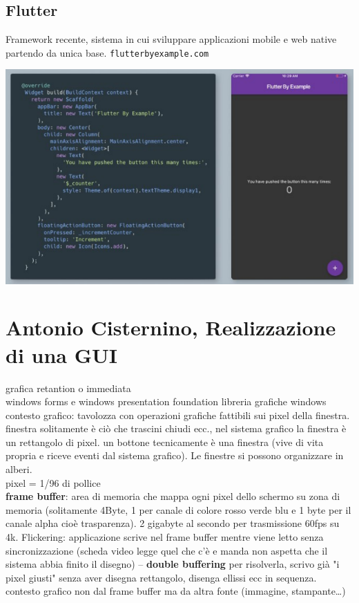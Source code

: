 \documentclass[10pt]{article}
\begin{document}
\subsection{Flutter}
Framework recente, sistema in cui sviluppare applicazioni mobile e web native partendo da unica base. \texttt{flutterbyexample.com}
\begin{center}
\includegraphics[scale=1]{flutter.png}
\end{center}

\pagebreak
\section{Antonio Cisternino, Realizzazione di una GUI}
grafica retantion o immediata\\
windows forms e windows presentation foundation libreria grafiche windows\\
contesto grafico: tavolozza con operazioni grafiche fattibili sui pixel della finestra.\\
finestra solitamente è ciò che trascini chiudi ecc., nel sistema grafico la finestra è un rettangolo di pixel. un bottone tecnicamente è una finestra (vive di vita propria e riceve eventi dal sistema grafico). Le finestre si possono organizzare in alberi.\\
pixel = 1/96 di pollice\\
\textbf{frame buffer}: area di memoria che mappa ogni pixel dello schermo su zona di memoria (solitamente 4Byte, 1 per canale di colore rosso verde blu e 1 byte per il canale alpha cioè trasparenza). 2 gigabyte al secondo per trasmissione 60fps su 4k. Flickering: applicazione scrive nel frame buffer mentre viene letto senza sincronizzazione (scheda video legge quel che c'è e manda non aspetta che il sistema abbia finito il disegno) -- \textbf{double buffering} per risolverla, scrivo già "i pixel giusti" senza aver disegna rettangolo, disenga ellissi ecc in sequenza. contesto grafico non dal frame buffer ma da altra fonte (immagine, stampante\ldots)
\pagebreak
\end{document}
